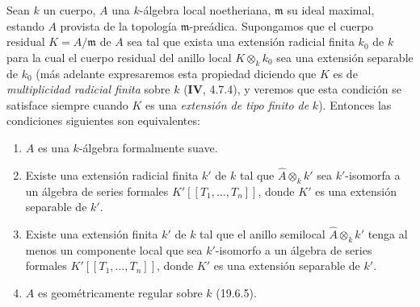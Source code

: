 \begin{proposition}[19.6.6]
\label{0.19.6.6-fr}
Sean $k$ un cuerpo, $A$ una $k$-álgebra local noetheriana, $\mathfrak m$ su
ideal maximal, estando $A$ provista de la topología $\mathfrak m$-preádica.
Supongamos que el cuerpo residual $K=A/\mathfrak m$ de $A$ sea tal que exista
una extensión radicial finita $k_0$ de $k$ para la cual el cuerpo residual del
anillo local $K\otimes_k k_0$ sea una extensión separable de $k_0$ \textup{(más
adelante expresaremos esta propiedad diciendo que $K$ es de
\emph{multiplicidad radicial finita} sobre $k$ ($\mathbf{IV}$, 4.7.4), y
veremos que esta condición se satisface siempre cuando $K$ es una
\emph{extensión de tipo finito de} $k$)}. Entonces las condiciones siguientes
son equivalentes:
\begin{enumerate}
  \item[\textup{a)}] $A$ es una $k$-álgebra formalmente suave.
  \item[\textup{b)}] Existe una extensión radicial finita $k'$ de $k$ tal que
  $\widehat A\otimes_k k'$ sea $k'$-isomorfa a un álgebra de series
  formales $K'[[T_1,\ldots,T_n]]$, donde $K'$ es una extensión separable de
  $k'$.
  \item[\textup{b')}] Existe una extensión finita $k'$ de $k$ tal que el anillo
  semilocal $\widehat A\otimes_k k'$ tenga \textup{al menos un} componente local
  que sea $k'$-isomorfo a un álgebra de series formales
  $K'[[T_1,\ldots,T_n]]$, donde $K'$ es una extensión separable de $k'$.
  \item[\textup{c)}] $A$ es geométricamente regular sobre $k$ \textup{(19.6.5)}.
\end{enumerate}
\end{proposition}

